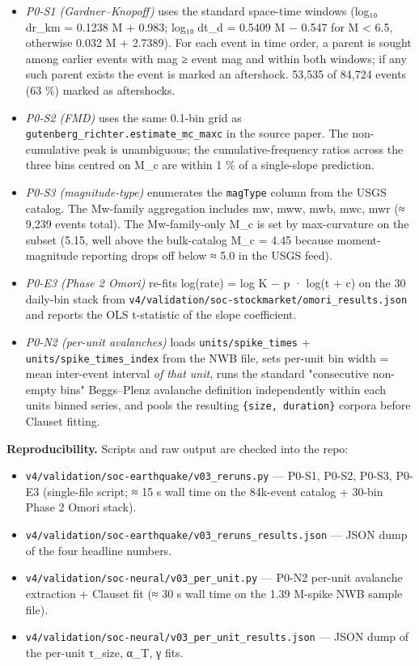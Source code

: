 \documentclass[
  11pt]{article}
\providecommand{\tightlist}{%
  \setlength{\itemsep}{0pt}\setlength{\parskip}{0pt}}
\begin{document}
\begin{itemize}
\tightlist
\item
  \emph{P0-S1 (Gardner--Knopoff)} uses the standard space-time windows
  (log₁₀ dr\_km = 0.1238 M + 0.983; log₁₀ dt\_d = 0.5409 M − 0.547 for M
  \textless{} 6.5, otherwise 0.032 M + 2.7389). For each event in time
  order, a parent is sought among earlier events with mag ≥ event mag
  and within both windows; if any such parent exists the event is marked
  an aftershock. 53,535 of 84,724 events (63 \%) marked as aftershocks.
\item
  \emph{P0-S2 (FMD)} uses the same 0.1-bin grid as
  \texttt{gutenberg\_richter.estimate\_mc\_maxc} in the source paper.
  The non-cumulative peak is unambiguous; the cumulative-frequency
  ratios across the three bins centred on M\_c are within 1 \% of a
  single-slope prediction.
\item
  \emph{P0-S3 (magnitude-type)} enumerates the \texttt{magType} column
  from the USGS catalog. The Mw-family aggregation includes mw, mww,
  mwb, mwc, mwr (≈ 9,239 events total). The Mw-family-only M\_c is set
  by max-curvature on the subset (5.15, well above the bulk-catalog M\_c
  = 4.45 because moment-magnitude reporting drops off below ≈ 5.0 in the
  USGS feed).
\item
  \emph{P0-E3 (Phase 2 Omori)} re-fits log(rate) = log K − p · log(t +
  c) on the 30 daily-bin stack from
  \texttt{v4/validation/soc-stockmarket/omori\_results.json} and reports
  the OLS t-statistic of the slope coefficient.
\item
  \emph{P0-N2 (per-unit avalanches)} loads \texttt{units/spike\_times} +
  \texttt{units/spike\_times\_index} from the NWB file, sets per-unit
  bin width = mean inter-event interval \emph{of that unit}, runs the
  standard "consecutive non-empty bins" Beggs--Plenz avalanche
  definition independently within each unit\textquotesingle s binned
  series, and pools the resulting \texttt{\{size,\ duration\}} corpora
  before Clauset fitting.
\end{itemize}

\textbf{Reproducibility.} Scripts and raw output are checked into the
repo:

\begin{itemize}
\tightlist
\item
  \texttt{v4/validation/soc-earthquake/v03\_reruns.py} --- P0-S1, P0-S2,
  P0-S3, P0-E3 (single-file script; ≈ 15 s wall time on the 84k-event
  catalog + 30-bin Phase 2 Omori stack).
\item
  \texttt{v4/validation/soc-earthquake/v03\_reruns\_results.json} ---
  JSON dump of the four headline numbers.
\item
  \texttt{v4/validation/soc-neural/v03\_per\_unit.py} --- P0-N2 per-unit
  avalanche extraction + Clauset fit (≈ 30 s wall time on the 1.39
  M-spike NWB sample file).
\item
  \texttt{v4/validation/soc-neural/v03\_per\_unit\_results.json} ---
  JSON dump of the per-unit τ\_size, α\_T, γ fits.
\end{itemize}
\end{document}
